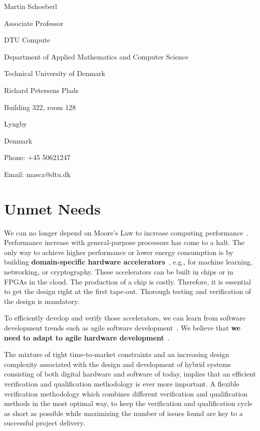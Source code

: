 \documentclass[fleqn,12pt]{article}
\begin{document}
Martin Schoeberl

\noindent Associate Professor

\bigskip

\noindent DTU Compute

\noindent Department of Applied Mathematics and Computer Science

\noindent Technical University of Denmark

\noindent Richard Petersens Plads

\noindent Building 322, room 128

 Lyngby

\noindent Denmark

\bigskip


\noindent Phone: +45 50621247

\noindent Email: masca@dtu.dk


\newpage
\section*{Unmet Needs}

We can no longer depend on Moore's Law to increase computing performance~\cite{dark-silicon:2011}.
Performance increase with general-purpose processors has come to a halt.
The only way to achieve higher performance or lower energy consumption
is by building {\bf domain-specific hardware accelerators}~\cite{domain-hw-acc:2020},
e.g., for machine learning, networking, or cryptography.
These accelerators can be built in chips or in FPGAs in the cloud.
The production of a chip is costly. Therefore, it is essential to get
the design right at the first tape-out. Thorough testing and verification of the design is mandatory.

To efficiently develop and verify those accelerators, we can learn from software development trends such as agile software development~\cite{agile:manifesto}.
We believe that {\bf we need to adapt to agile hardware development}~\cite{henn-patt:turing:2019}.

The mixture of tight time-to-market constraints and an increasing design complexity associated with the design and development of hybrid systems consisting of both digital hardware and software of today, implies that an efficient verification and qualification methodology is ever more important.
A flexible verification methodology which combines different verification and qualification methods in the most optimal way, to keep the verification and qualification cycle as short as possible while maximizing the number of issues found are key to a successful project delivery.
\end{document}
